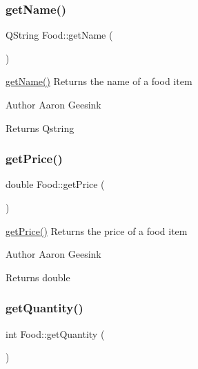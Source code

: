 \subsubsection{\texorpdfstring{getName()}{getName()}}
{\footnotesize\ttfamily Q\+String Food\+::get\+Name (\begin{DoxyParamCaption}{ }\end{DoxyParamCaption})}



\mbox{\hyperlink{class_food_a5652293c23e8b797d363c08efc585601}{get\+Name()}} Returns the name of a food item 

\begin{DoxyAuthor}{Author}
Aaron Geesink 
\end{DoxyAuthor}
\begin{DoxyReturn}{Returns}
Qstring 
\end{DoxyReturn}
\mbox{\label{class_food_a16683d009125620dd07432fbe7711597}} 
\subsubsection{\texorpdfstring{getPrice()}{getPrice()}}
{\footnotesize\ttfamily double Food\+::get\+Price (\begin{DoxyParamCaption}{ }\end{DoxyParamCaption})}



\mbox{\hyperlink{class_food_a16683d009125620dd07432fbe7711597}{get\+Price()}} Returns the price of a food item 

\begin{DoxyAuthor}{Author}
Aaron Geesink 
\end{DoxyAuthor}
\begin{DoxyReturn}{Returns}
double 
\end{DoxyReturn}
\mbox{\label{class_food_ac05d435166d85ee4e7022e98f91f76d7}} 
\subsubsection{\texorpdfstring{getQuantity()}{getQuantity()}}
{\footnotesize\ttfamily int Food\+::get\+Quantity (\begin{DoxyParamCaption}{ }\end{DoxyParamCaption})}



